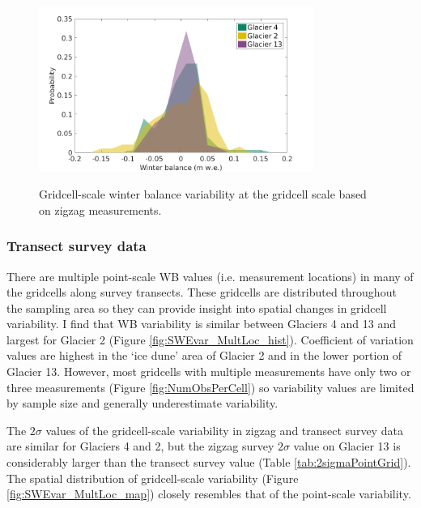 \documentclass{sfuthesis}
\begin{document}
\begin{figure}[H]
	\centering
	\includegraphics[width =0.8\textwidth]{ZigzagPDF_G.png}\\
	\caption{Gridcell-scale winter balance variability at the gridcell scale based on zigzag measurements.}
	\label{fig:SWEvar_ZZG_hist}
\end{figure}

\subsubsection{Transect survey data}
There are multiple point-scale WB values (i.e. measurement locations) in many of the gridcells along survey transects. These gridcells are distributed throughout the sampling area so they can provide insight into spatial changes in gridcell variability. I find that WB variability is similar between Glaciers 4 and 13 and largest for Glacier 2 (Figure \ref{fig:SWEvar_MultLoc_hist}). Coefficient of variation values are highest in the `ice dune' area of Glacier 2 and in the lower portion of Glacier 13.  However, most gridcells with multiple measurements have only two or three measurements (Figure \ref{fig:NumObsPerCell}) so variability values are limited by sample size and generally underestimate variability. 

The $2\sigma$ values of the gridcell-scale variability in zigzag and transect survey data are similar for Glaciers 4 and 2, but the zigzag survey $2\sigma$ value on Glacier 13 is considerably larger than the transect survey value (Table  \ref{tab:2sigmaPointGrid}). The spatial distribution of gridcell-scale variability (Figure \ref{fig:SWEvar_MultLoc_map}) closely resembles that of the point-scale variability. 
\end{document}

